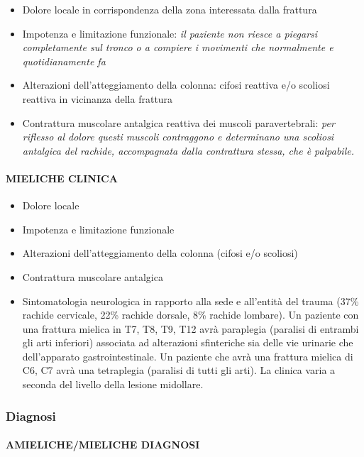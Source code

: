 \begin{itemize}
\item
  Dolore locale in corrispondenza della zona interessata dalla frattura
\item
  Impotenza e limitazione funzionale: \emph{il paziente non riesce a piegarsi completamente sul tronco o a compiere i movimenti che normalmente e quotidianamente fa}
\item
  Alterazioni dell'atteggiamento della colonna: cifosi reattiva e/o scoliosi reattiva in vicinanza della frattura
\item
  Contrattura muscolare antalgica reattiva dei muscoli paravertebrali: \emph{per riflesso al dolore questi muscoli contraggono e determinano una \emph{scoliosi antalgica} del rachide, accompagnata dalla contrattura stessa, che è palpabile.}
\end{itemize}

\paragraph{MIELICHE CLINICA}

\begin{itemize}
\item
  Dolore locale
\item
  Impotenza e limitazione funzionale
\item
  Alterazioni dell'atteggiamento della colonna (cifosi e/o scoliosi)
\item
  Contrattura muscolare antalgica
\item
  Sintomatologia neurologica in rapporto alla sede e all'entità del trauma (37\% rachide cervicale, 22\% rachide dorsale, 8\% rachide lombare). Un paziente con una frattura mielica in T7, T8, T9, T12 avrà paraplegia (paralisi di entrambi gli arti inferiori) associata ad alterazioni sfinteriche sia delle vie urinarie che dell'apparato gastrointestinale. Un paziente che avrà una frattura mielica di C6, C7 avrà una tetraplegia (paralisi di tutti gli arti). La clinica varia a seconda del livello della lesione midollare.
\end{itemize}

\subsubsection{Diagnosi}

\paragraph{AMIELICHE/MIELICHE DIAGNOSI}

